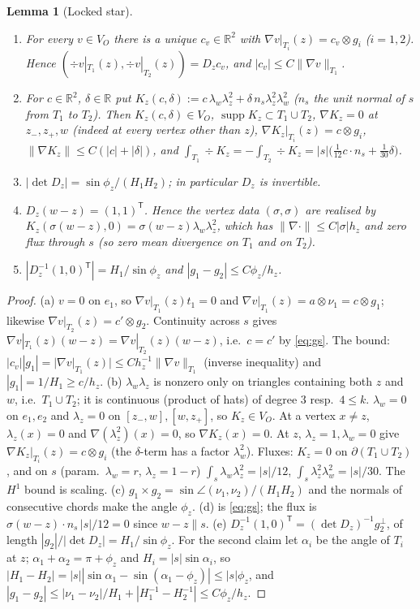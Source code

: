 \documentclass[11pt]{article}
\newtheorem{lemma}[theorem]{Lemma}
\theoremstyle{remark}
\newcommand{\VO}{V_O}
\newcommand{\norm}[1]{\|#1\|}
\begin{document}
\begin{lemma}[Locked star]\label{lem:K}
\begin{enumerate}
\item[(a)] For every $v\in\VO$ there is a unique $c_v\in\mathbb R^2$ with $\nabla v|_{T_i}(z)=c_v\otimes g_i$
($i=1,2$). Hence $(\div v|_{T_1}(z),\div v|_{T_2}(z))=D_zc_v$, and $|c_v|\le C\norm{\nabla v}_{T_1}$.
\item[(b)] For $c\in\mathbb R^2$, $\delta\in\mathbb R$ put
$K_z(c,\delta):=c\,\lambda_w\lambda_z^2+\delta\,n_s\lambda_z^2\lambda_w^2$ ($n_s$ the unit normal of $s$ from $T_1$ to $T_2$).
Then $K_z(c,\delta)\in\VO$, $\operatorname{supp}K_z\subset T_1\cup T_2$, $\nabla K_z=0$ at $z_-,z_+,w$ (indeed at every vertex other than $z$),
$\nabla K_z|_{T_i}(z)=c\otimes g_i$, $\norm{\nabla K_z}\le C(|c|+|\delta|)$, and
$\int_{T_1}\div K_z=-\int_{T_2}\div K_z=|s|\big(\tfrac1{12}c\cdot n_s+\tfrac1{30}\delta\big)$.
\item[(c)] $|\det D_z|=\sin\phi_z/(H_1H_2)$; in particular $D_z$ is invertible.
\item[(d)] $D_z(w-z)=(1,1)^{\mathsf T}$. Hence the vertex data $(\sigma,\sigma)$ are realised by
$K_z(\sigma(w-z),0)=\sigma(w-z)\lambda_w\lambda_z^2$, which has $\norm{\nabla\cdot}\le C|\sigma|h_z$ and
\emph{zero} flux through $s$ (so zero mean divergence on $T_1$ and on $T_2$).
\item[(e)] $|D_z^{-1}(1,0)^{\mathsf T}|=H_1/\sin\phi_z$ and $|g_1-g_2|\le C\phi_z/h_z$.
\end{enumerate}
\end{lemma}
\begin{proof}
(a) $v=0$ on $e_1$, so $\nabla v|_{T_1}(z)t_1=0$ and $\nabla v|_{T_1}(z)=a\otimes\nu_1=c\otimes g_1$; likewise
$\nabla v|_{T_2}(z)=c'\otimes g_2$. Continuity across $s$ gives $\nabla v|_{T_1}(z)(w-z)=\nabla v|_{T_2}(z)(w-z)$,
i.e.\ $c=c'$ by \eqref{eq:gs}. The bound: $|c_v||g_1|=|\nabla v|_{T_1}(z)|\le Ch_z^{-1}\norm{\nabla v}_{T_1}$ (inverse
inequality) and $|g_1|=1/H_1\ge c/h_z$.
(b) $\lambda_w\lambda_z$ is nonzero only on triangles containing both $z$ and $w$, i.e.\ $T_1\cup T_2$; it is
continuous (product of hats) of degree $3$ resp.\ $4\le k$. $\lambda_w=0$ on $e_1,e_2$ and $\lambda_z=0$ on
$[z_-,w],[w,z_+]$, so $K_z\in\VO$. At a vertex $x\ne z$, $\lambda_z(x)=0$ and $\nabla(\lambda_z^2)(x)=0$, so
$\nabla K_z(x)=0$. At $z$, $\lambda_z=1,\lambda_w=0$ give $\nabla K_z|_{T_i}(z)=c\otimes g_i$ (the $\delta$-term has a
factor $\lambda_w^2$). Fluxes: $K_z=0$ on $\partial(T_1\cup T_2)$, and on $s$ (param.\ $\lambda_w=r$,
$\lambda_z=1-r$) $\int_s\lambda_w\lambda_z^2=|s|/12$, $\int_s\lambda_z^2\lambda_w^2=|s|/30$. The $H^1$ bound is scaling.
(c) $g_1\times g_2=\sin\angle(\nu_1,\nu_2)/(H_1H_2)$ and the normals of consecutive chords make the angle $\phi_z$.
(d) is \eqref{eq:gs}; the flux is $\sigma(w-z)\cdot n_s\,|s|/12=0$ since $w-z\parallel s$.
(e) $D_z^{-1}(1,0)^{\mathsf T}=(\det D_z)^{-1}g_2^{\perp}$, of length $|g_2|/|\det D_z|=H_1/\sin\phi_z$. For the second
claim let $\alpha_i$ be the angle of $T_i$ at $z$; $\alpha_1+\alpha_2=\pi+\phi_z$ and $H_i=|s|\sin\alpha_i$, so
$|H_1-H_2|=|s||\sin\alpha_1-\sin(\alpha_1-\phi_z)|\le|s|\phi_z$, and
$|g_1-g_2|\le|\nu_1-\nu_2|/H_1+|H_1^{-1}-H_2^{-1}|\le C\phi_z/h_z$.
\end{proof}
\end{document}
